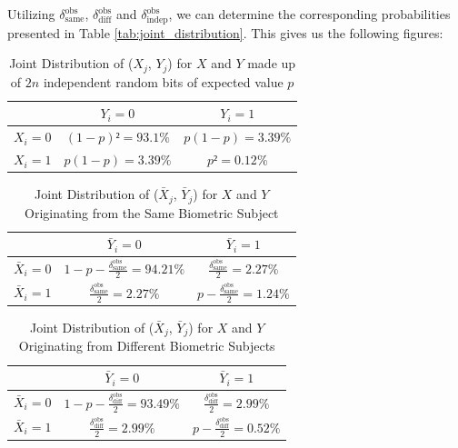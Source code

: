 Utilizing \(\delta_{\text{same}}^{\text{obs}}\), \(\delta_{\text{diff}}^{\text{obs}}\) and \(\delta_{\text{indep}}^{\text{obs}}\), we can determine the corresponding probabilities presented in Table \ref{tab:joint_distribution}. This gives us the following figures:


\begin{table}[H]
    \centering
    \renewcommand{\arraystretch}{1.5}
    \begin{tabular}{|c|c|c|}
        \hline
        & $Y_i = 0$ & $Y_i = 1$\\
        \hline
        $X_i = 0$ & $(1-p)² = 93.1\% $ & $p(1-p) = 3.39\%$\\
        \hline
        $X_i = 1$ & $p(1-p) = 3.39\% $ & $p² = 0.12\%$\\
        \hline
    \end{tabular}
    \caption{Joint Distribution of ($X_j$, $Y_j$) for \(X\) and \(Y\) made up of \(2n\) independent random bits of expected value \(p\)}
    \label{tab:joint_distribution_deltaindep}
\end{table}


\begin{table}[H]
    \centering
    \renewcommand{\arraystretch}{1.5}
    \begin{tabular}{|c|c|c|}
        \hline
        & $\bar{Y}_i = 0$ & $\bar{Y}_i = 1$\\
        \hline
        $\bar{X}_i = 0$ & $1 - p - \frac{\delta_{\text{same}}^{\text{obs}}}{2} = 94.21\% $ & $\frac{\delta_{\text{same}}^{\text{obs}}}{2} = 2.27\%$\\
        \hline
        $\bar{X}_i = 1$ & $\frac{\delta_{\text{same}}^{\text{obs}}}{2} = 2.27\%$ & $p - \frac{\delta_{\text{same}}^{\text{obs}}}{2} = 1.24\%$\\
        \hline
    \end{tabular}
    \caption{Joint Distribution of ($\bar{X}_j$, $\bar{Y}_j$) for \(X\) and \(Y\)  Originating from the Same Biometric Subject}
    \label{tab:joint_distribution_deltasame}
\end{table}

\begin{table}[H]
    \centering
    \renewcommand{\arraystretch}{1.5}
    \begin{tabular}{|c|c|c|}
        \hline
        & $\bar{Y}_i = 0$ & $\bar{Y}_i = 1$\\
        \hline
        $\bar{X}_i = 0$ & $1 - p - \frac{\delta_{\text{diff}}^{\text{obs}}}{2} = 93.49\% $ & $\frac{\delta_{\text{diff}}^{\text{obs}}}{2} = 2.99\%$\\
        \hline
        $\bar{X}_i = 1$ & $\frac{\delta_{\text{diff}}^{\text{obs}}}{2} = 2.99\%$ & $p - \frac{\delta_{\text{diff}}^{\text{obs}}}{2} = 0.52\%$\\
        \hline
    \end{tabular}
    \caption{Joint Distribution of ($\bar{X}_j$, $\bar{Y}_j$) for \(X\) and \(Y\) Originating from Different Biometric Subjects}
    \label{tab:joint_distribution_deltadiff}
\end{table}









